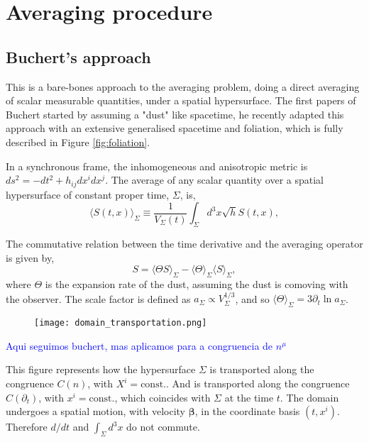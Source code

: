 \chapter{Averaging procedure}




\section{Buchert's approach}

This is a bare-bones approach to the averaging problem, doing a direct averaging of scalar measurable quantities, under a spatial hypersurface. The first papers of Buchert started by assuming a "dust" like spacetime\cite{Buchert_2000}\cite{Buchert_2001}, he recently adapted this approach with an extensive generalised spacetime\cite{Buchert_2020} and foliation, which is fully described in Figure \ref{fig:foliation}.
   
In a synchronous frame, the inhomogeneous and anisotropic metric is $ds^2=-dt^2+h_{ij}dx^idx^j$. The average of any scalar quantity over a spatial hypersurface of constant proper time, $\Sigma$, is,
\begin{equation}
	\langle S(t,x)\rangle_{\Sigma}\equiv \frac{1}{V_{\Sigma}(t)}\int_{\Sigma} d^3x \sqrt{h}S(t,x),
    \label{eqn:cbuchert_average}
\end{equation}

The commutative relation between the time derivative and the averaging operator is given by,
\begin{equation}
	[\partial_t \cdot, \langle\cdot \rangle_{\Sigma}] S=\langle \Theta S\rangle_{\Sigma}-\langle \Theta\rangle_{\Sigma}\langle S\rangle_{\Sigma},
	\label{eqn:comoving_commutation_rule_buchert}
\end{equation}
where $\Theta$ is the expansion rate of the dust, assuming the dust is comoving with the observer. The scale factor is defined as $a_{\Sigma}\propto V_{\Sigma}^{1/3}$, and so $\langle\Theta\rangle_{\Sigma}=3\partial_t \ln a_{\Sigma}$.



\begin{figure}[h]
	\centering
	\texttt{[image: domain\_transportation.png]}
\end{figure}

\textcolor{blue}{Aqui seguimos buchert, mas aplicamos para a congruencia de $n^\mu$}

This figure represents how the hypersurface $\Sigma$ is transported along the congruence $C(n)$, with $X^i=\text{const.}$. 
And is transported along the congruence $C(\partial_t)$, with $x^i=\text{const.}$, which coincides with $\Sigma$ at the time $t$. 
The domain undergoes a spatial motion, with velocity $\mathbf{\beta}$, in the coordinate basis $(t,x^i)$. Therefore $d/dt$ and $\int_\Sigma d^3x$ do not commute.

